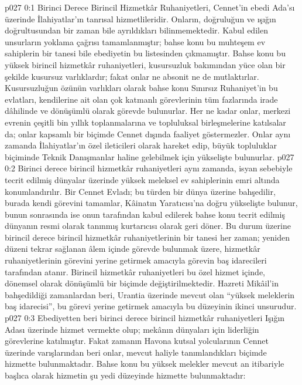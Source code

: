 \vs p027 0:1 Birinci Derece Birincil Hizmetkâr Ruhaniyetleri, Cennet’in ebedi Ada’sı üzerinde İlahiyatlar’ın tanrısal hizmetlileridir. Onların, doğruluğun ve ışığın doğrultusundan bir zaman bile ayrıldıkları bilinmemektedir. Kabul edilen unsurların yoklama çağrısı tamamlanmıştır; bahse konu bu muhteşem ev sahiplerin bir tanesi bile ebediyetin bu listesinden çıkmamıştır. Bahse konu bu yüksek birincil hizmetkâr ruhaniyetleri, kusursuzluk bakımından yüce olan bir şekilde kusursuz varlıklardır; fakat onlar ne absonit ne de mutlaktırlar. Kusursuzluğun özünün varlıkları olarak bahse konu Sınırsız Ruhaniyet’in bu evlatları, kendilerine ait olan çok katmanlı görevlerinin tüm fazlarında irade dâhilinde ve dönüşümlü olarak görevde bulunurlar. Her ne kadar onlar, merkezi evrenin çeşitli bin yıllık toplanmalarına ve topluluksal birleşmelerine katılsalar da; onlar kapsamlı bir biçimde Cennet dışında faaliyet göstermezler. Onlar aynı zamanda İlahiyatlar’ın özel ileticileri olarak hareket edip, büyük topluluklar biçiminde Teknik Danışmanlar haline gelebilmek için yükselişte bulunurlar.
\vs p027 0:2 Birinci derece birincil hizmetkâr ruhaniyetleri aynı zamanda, isyan sebebiyle tecrit edilmiş dünyalar üzerinde yüksek meleksel ev sahiplerinin emri altında konumlandırılır. Bir Cennet Evladı; bu türden bir dünya üzerine bahşedilir, burada kendi görevini tamamlar, Kâinatın Yaratıcısı’na doğru yükselişte bulunur, bunun sonrasında ise onun tarafından kabul edilerek bahse konu tecrit edilmiş dünyanın resmi olarak tanınmış kurtarıcısı olarak geri döner. Bu durum üzerine birincil derece birincil hizmetkâr ruhaniyetlerinin bir tanesi her zaman; yeniden düzeni tekrar sağlanan âlem içinde görevde bulunmak üzere, hizmetkâr ruhaniyetlerinin görevini yerine getirmek amacıyla görevin baş idarecileri tarafından atanır. Birincil hizmetkâr ruhaniyetleri bu özel hizmet içinde, dönemsel olarak dönüşümlü bir biçimde değiştirilmektedir. Hazreti Mikâil’in bahşedildiği zamanlardan beri, Urantia üzerinde mevcut olan “yüksek meleklerin baş idarecisi”, bu görevi yerine getirmek amacıyla bu düzeyinin ikinci unsurudur.
\vs p027 0:3 Ebediyetten beri birinci derece birincil hizmetkâr ruhaniyetleri Işığın Adası üzerinde hizmet vermekte olup; mekânın dünyaları için liderliğin görevlerine katılmıştır. Fakat zamanın Havona kutsal yolcularının Cennet üzerinde varışlarından beri onlar, mevcut haliyle tanımlandıkları biçimde hizmette bulunmaktadır. Bahse konu bu yüksek melekler mevcut an itibariyle başlıca olarak hizmetin şu yedi düzeyinde hizmette bulunmaktadır:
